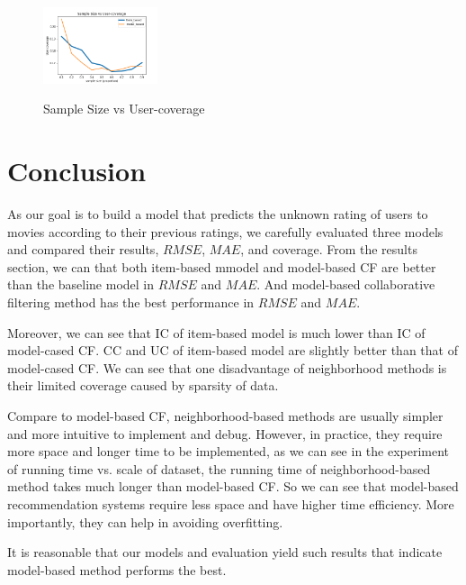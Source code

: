 \documentclass[12pt,journal,compsoc]{IEEEtran}
\begin{document}
\begin{figure}[H]
\centering
\caption{Sample Size vs User-coverage}
\includegraphics[width=0.30\textwidth]{img/2Svsuc.png}
\label{fig_sim}
\end{figure}

\section{Conclusion}

As our goal is to build a model that predicts the unknown rating of users to movies according to their previous ratings, we carefully evaluated three models and compared their results, $RMSE$, $MAE$, and coverage. From the results section, we can that both item-based mmodel and model-based CF are better than the baseline model in $RMSE$ and $MAE$. And model-based collaborative filtering method has the best performance in $RMSE$ and $MAE$.

Moreover, we can see that IC of item-based model is much lower than IC of model-cased CF. CC and UC of item-based model are slightly better than that of model-cased CF. We can see that one disadvantage of neighborhood methods is their limited coverage caused by sparsity of data.

Compare to model-based CF, neighborhood-based methods are usually simpler and more intuitive to implement and debug. However, in practice, they require more space and longer time to be implemented, as we can see in the experiment of running time vs. scale of dataset, the running time of neighborhood-based method takes much longer than model-based CF. So we can see that model-based recommendation systems require less space and have higher time efficiency. More importantly, they can help in avoiding overfitting. 

It is reasonable that our models and evaluation yield such results that indicate model-based method performs the best.
\end{document}
